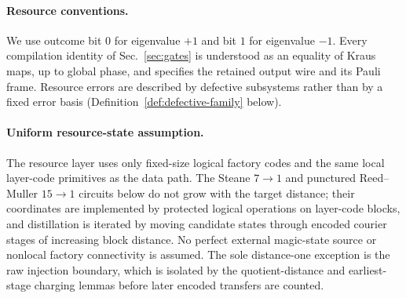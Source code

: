 \documentclass[aps,prx,reprint,superscriptaddress,nofootinbib,floatfix,longbibliography]{revtex4-2}
\theoremstyle{definition}
\begin{document}
\paragraph{Resource conventions.}
We use outcome bit $0$ for eigenvalue $+1$ and bit $1$ for eigenvalue $-1$.
Every compilation identity of Sec.~\ref{sec:gates} is understood as an equality of Kraus
maps, up to global phase, and specifies the retained output wire and its Pauli
frame.  Resource errors are described by defective subsystems rather than by
a fixed error basis (Definition~\ref{def:defective-family} below).

\paragraph{Uniform resource-state assumption.}
The resource layer uses only fixed-size logical factory codes and the same local layer-code primitives as the data path.  The Steane $7\!\to\!1$ and punctured Reed--Muller $15\!\to\!1$ circuits below do not grow with the target distance; their coordinates are implemented by protected logical operations on layer-code blocks, and distillation is iterated by moving candidate states through encoded courier stages of increasing block distance.  No perfect external magic-state source or nonlocal factory connectivity is assumed.  The sole distance-one exception is the raw injection boundary, which is isolated by the quotient-distance and earliest-stage charging lemmas before later encoded transfers are counted.
\end{document}
